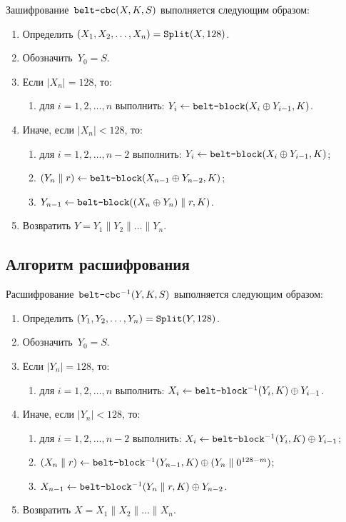 Зашифрование~$\texttt{belt-cbc}(X,K,S)$ выполняется следующим образом: 
\begin{enumerate}
\item
Определить $(X_1,X_2,\ldots,X_n)=\mathop{\texttt{Split}}\nolimits(X,128)$.
\item
Обозначить~$Y_0=S$.
\item
Если $|X_n|=128$, то:
\begin{enumerate}
\item
для $i=1,2,\ldots,n$ выполнить: 
$Y_i\leftarrow \texttt{belt-block}(X_i\oplus Y_{i-1},K)$.
\end{enumerate}
\item
Иначе, если $|X_n|<128$, то:
\begin{enumerate}
\item
для $i=1,2,\ldots,n-2$ выполнить: 
$Y_i\leftarrow \texttt{belt-block}(X_i\oplus Y_{i-1},K)$;
\item
$(Y_n\parallel r)\leftarrow \texttt{belt-block}(X_{n-1}\oplus Y_{n-2},K)$;
\item
$Y_{n-1}\leftarrow \texttt{belt-block}((X_n\oplus Y_n)\parallel r,K)$.
\end{enumerate}
\item
Возвратить
$Y=Y_1\parallel Y_2\parallel\ldots\parallel Y_n$.
\end{enumerate}

\subsection{Алгоритм расшифрования}

Расшифрование~$\texttt{belt-cbc}^{-1}(Y,K,S)$ выполняется следующим образом: 
\begin{enumerate}
\item
Определить $(Y_1,Y_2,\ldots,Y_n)=\mathop{\texttt{Split}}\nolimits(Y,128)$.
\item
Обозначить~$Y_0=S$.
\item
Если $|Y_n|=128$, то:
\begin{enumerate}
\item
для $i=1,2,\ldots,n$ выполнить: 
$X_i\leftarrow \texttt{belt-block}^{-1}(Y_i,K)\oplus Y_{i-1}$.
\end{enumerate}
\item
Иначе, если $|Y_n|<128$, то:
\begin{enumerate}
\item
для $i=1,2,\ldots,n-2$ выполнить: 
$X_i\leftarrow \texttt{belt-block}^{-1}(Y_i,K)\oplus Y_{i-1}$;
\item
$(X_n\parallel r)\leftarrow \texttt{belt-block}^{-1}(Y_{n-1},K)\oplus 
(Y_n\parallel 0^{128-m})$;
\item
$X_{n-1}\leftarrow \texttt{belt-block}^{-1}(Y_n\parallel r,K)\oplus Y_{n-2}$.
\end{enumerate}
\item
Возвратить
$X=X_1\parallel X_2\parallel\ldots\parallel X_n$.
\end{enumerate}
